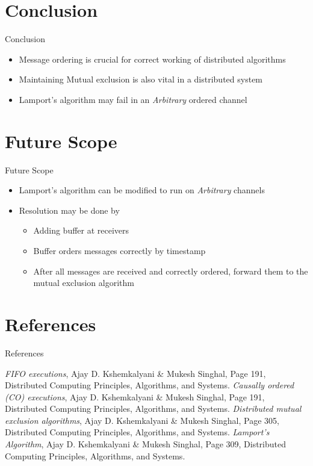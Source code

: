 \documentclass{beamer}
\begin{document}
\section{Conclusion}
	\begin{frame}{Conclusion}
		\begin{itemize}
			\item Message ordering is crucial for correct working of distributed algorithms
			\item Maintaining Mutual exclusion is also vital in a distributed system
			\item Lamport's algorithm may fail in an \textit{Arbitrary} ordered channel
		\end{itemize}
	\end{frame}


\section{Future Scope}
	\begin{frame}{Future Scope}
		\begin{itemize}
			\item Lamport's algorithm can be modified to run on \textit{Arbitrary} channels
			\item Resolution may be done by
			\begin{itemize}
				\item Adding buffer at receivers
				\item Buffer orders messages correctly by timestamp
				\item After all messages are received and correctly ordered, forward them to the mutual exclusion algorithm
			\end{itemize}
		\end{itemize}
	\end{frame}
	

\section{References}
	\begin{frame}[allowframebreaks]{References}
		
		\begin{thebibliography}{4}
		 \textit{FIFO executions}, Ajay D. Kshemkalyani \& Mukesh Singhal, Page 191, Distributed Computing Principles, Algorithms, and Systems.
		 \textit{Causally ordered (CO) executions}, Ajay D. Kshemkalyani \& Mukesh Singhal, Page 191, Distributed Computing Principles, Algorithms, and Systems.
		\textit{Distributed mutual exclusion algorithms}, Ajay D. Kshemkalyani \& Mukesh Singhal, Page 305, Distributed Computing Principles, Algorithms, and Systems.
		\textit{Lamport's Algorithm}, Ajay D. Kshemkalyani \& Mukesh Singhal, Page 309, Distributed Computing Principles, Algorithms, and Systems.
		
		\end{thebibliography}
	
	\end{frame}
\end{document}
